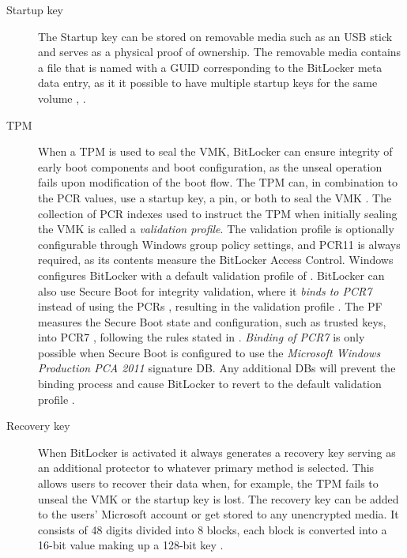 \begin{description}
    \item[Startup key] The Startup key can be stored on removable media such as an \ac{USB} stick and serves as a physical proof of ownership.
        The removable media contains a  file that is named with a \ac{GUID} corresponding to the BitLocker meta data entry, as it it possible to have multiple startup keys for the same volume \cite[Section 2.6]{bde-format-spec}, \cite{microsoft-windows-prepare-your-org}.

    \item[TPM]
        When a \ac{TPM} is used to seal the \ac{VMK}, BitLocker can ensure integrity of early boot components and boot configuration, as the unseal operation fails upon modification of the boot flow.
        The \ac{TPM} can, in combination to the \ac{PCR} values, use a startup key, a pin, or both to seal the \ac{VMK} \cite{microsoft-bitlocker-countermeasures}.
        The collection of \ac{PCR} indexes used to instruct the \ac{TPM} when initially sealing the \ac{VMK} is called a \emph{validation profile}.
        The validation profile is optionally configurable through Windows group policy settings, and \ac{PCR}11 is always required, as its contents measure the BitLocker Access Control.
        Windows configures BitLocker with a default validation profile of \hyperref[tab:pcr-usage]{} \cite{microsoft-windows-bitlocker-group-policy-settings}.
        BitLocker can also use Secure Boot for integrity validation, where it \hypertarget{pcr7-binding}{\emph{binds to \ac{PCR}7}} instead of using the \acp{PCR} \hyperref[tab:pcr-usage]{}, resulting in the validation profile \hyperref[tab:pcr-usage]{} \cite{microsoft-windows-bitlocker-group-policy-settings-pcr7}.
        The \ac{PF} measures the Secure Boot state and configuration, such as trusted keys, into \ac{PCR}7 \cite{microsoft-windows-bitlocker-group-policy-settings-pcr7}, following the rules stated in \cite{microsoft-trusted-execution-environment}.
        \emph{Binding of \ac{PCR}7} is only possible when Secure Boot is configured to use the \emph{Microsoft Windows Production PCA 2011} signature \ac{DB}. Any additional \acp{DB} will prevent the binding process and cause BitLocker to revert to the default validation profile \cite{microsoft-pcr7-binding}.

    \item[Recovery key]
        When BitLocker is activated it always generates a recovery key serving as an additional protector to whatever primary method is selected.
        This allows users to recover their data when, for example, the \ac{TPM} fails to unseal the \ac{VMK} or the startup key is lost.
        The recovery key can be added to the users' Microsoft account or get stored to any unencrypted media.
        It consists of 48 digits divided into 8 blocks, each block is converted into a 16-bit value making up a 128-bit key \cite[Section 2.4]{bde-format-spec}.


\end{description}
